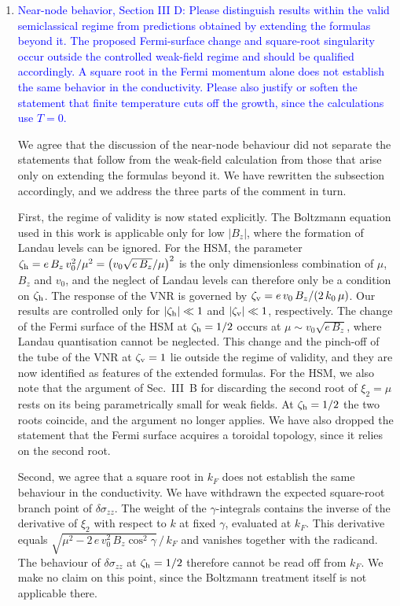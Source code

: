 \documentclass[aps,prb,onecolumn,nofootinbib,citeautoscript,10pt]{revtex4-2}
\begin{document}
\begin{enumerate}
\item \textcolor{blue}{Near-node behavior, Section III D: Please distinguish results within the valid semiclassical regime from predictions obtained by extending the formulas beyond it. The proposed Fermi-surface change and square-root singularity occur outside the controlled weak-field regime and should be qualified accordingly. A square root in the Fermi momentum alone does not establish the same behavior in the conductivity. Please also justify or soften the statement that finite temperature cuts off the growth, since the calculations use $T=0$.}

We agree that the discussion of the near-node behaviour did not separate the statements that follow from the weak-field calculation from those that arise only on extending the formulas beyond it. We have rewritten the subsection accordingly, and we address the three parts of the comment in turn.

First, the regime of validity is now stated explicitly. The Boltzmann equation used in this work is applicable only for low $|B_z|$, where the formation of Landau levels can be ignored. For the HSM, the parameter $\zeta_{\rm h}=e\,B_z\,v_0^2/\mu^2=\left(v_0\sqrt{e\,B_z}/\mu\right)^2$ is the only dimensionless combination of $\mu$, $B_z$ and $v_0$, and the neglect of Landau levels can therefore only be a condition on $\zeta_{\rm h}$. The response of the VNR is governed by $\zeta_{\rm v}=e\,v_0\,B_z/(2\,k_0\,\mu)$. Our results are controlled only for $|\zeta_{\rm h}|\ll1$ and $|\zeta_{\rm v}|\ll1$, respectively. The change of the Fermi surface of the HSM at $\zeta_{\rm h}=1/2$ occurs at $\mu\sim v_0\sqrt{e\,B_z}$, where Landau quantisation cannot be neglected. This change and the pinch-off of the tube of the VNR at $\zeta_{\rm v}=1$ lie outside the regime of validity, and they are now identified as features of the extended formulas. For the HSM, we also note that the argument of Sec.~III~B for discarding the second root of $\xi_2=\mu$ rests on its being parametrically small for weak fields. At $\zeta_{\rm h}=1/2$ the two roots coincide, and the argument no longer applies. We have also dropped the statement that the Fermi surface acquires a toroidal topology, since it relies on the second root.

Second, we agree that a square root in $k_F$ does not establish the same behaviour in the conductivity. We have withdrawn the expected square-root branch point of $\delta\sigma_{zz}$. The weight of the $\gamma$-integrals contains the inverse of the derivative of $\xi_2$ with respect to $k$ at fixed $\gamma$, evaluated at $k_F$. This derivative equals $\sqrt{\mu^2-2\,e\,v_0^2\,B_z\cos^2\gamma}\,/\,k_F$ and vanishes together with the radicand. The behaviour of $\delta\sigma_{zz}$ at $\zeta_{\rm h}=1/2$ therefore cannot be read off from $k_F$. We make no claim on this point, since the Boltzmann treatment itself is not applicable there.


\end{enumerate}
\end{document}
